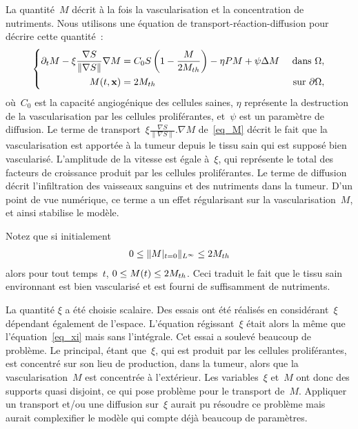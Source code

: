 \documentclass[main.tex]{subfiles}
\begin{document}
La quantité~$M$ décrit à la fois la vascularisation et la concentration de nutriments. Nous utilisons une équation de transport-réaction-diffusion pour décrire cette quantité~:
\begin{equation}\label{eq_M}
\left\{
\begin{aligned}
\partial_t M - \xi \frac{\nabla S}{\| \nabla S \|}\nabla M &= C_0 S
\left(1-\frac{M}{2M_{th}}\right) - \eta PM +\psi \Delta M & \textrm{ dans } \Omega, \\
M(t,\mathbf{x})&= 2M_{th} & \textrm{ sur } \partial \Omega,
\end{aligned}
\right.
\end{equation}
où~$C_0$ est la capacité angiogénique des cellules saines, 
$\eta$ représente la destruction de la vascularisation par les cellules proliférantes, et~$\psi$ est un paramètre de diffusion.  
Le terme de transport~$\xi \frac{\nabla S}{\| \nabla S \|}. \nabla M$ de~\eqref{eq_M} décrit le fait que la vascularisation est apportée à la tumeur depuis le tissu sain qui est supposé bien vascularisé.  L'amplitude de la vitesse est égale à~$\xi$, qui représente le total des facteurs de croissance produit par les cellules proliférantes. 
Le terme de diffusion décrit l'infiltration des vaisseaux sanguins et des nutriments dans la tumeur. D'un point de vue numérique, ce terme a un effet régularisant sur la vascularisation~$M$, et ainsi stabilise le modèle. 


Notez que si initialement 
\begin{align}\label{eq:borneM}
0\leq \|M|_{t=0}\|_{L^\infty}\leq 2M_{th}
\end{align}
alors pour tout temps~$t$, $0\leq M(t) \leq 2M_{th}$. Ceci traduit le fait que le tissu sain environnant est bien vascularisé et est fourni de suffisamment de nutriments.


La quantité $\xi$ a été choisie scalaire. Des essais ont été réalisés en considérant~$\xi$ dépendant également de l'espace. L'équation régissant~$\xi$ était alors la même que l'équation~\eqref{eq_xi} mais sans l'intégrale. Cet essai a soulevé beaucoup de problème. Le principal, étant que~$\xi$, qui est produit par les cellules proliférantes, est concentré sur son lieu de production, \ie dans la tumeur, alors que la vascularisation~$M$ est concentrée à l'extérieur. Les variables~$\xi$ et~$M$ ont donc des supports quasi disjoint, ce qui pose  problème pour le transport de~$M$. Appliquer un transport et/ou une diffusion sur~$\xi$ aurait pu résoudre ce problème mais aurait complexifier le modèle qui compte déjà beaucoup de paramètres.
\end{document}
